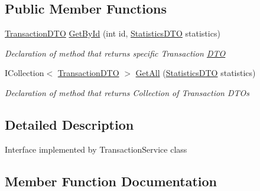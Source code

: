 \subsection*{Public Member Functions}
\begin{DoxyCompactItemize}
\item 
\mbox{\hyperlink{class_gielda_l2_1_1_i_n_f_r_a_s_t_r_u_c_t_u_r_e_1_1_d_t_o_1_1_transaction_d_t_o}{Transaction\+D\+TO}} \mbox{\hyperlink{interface_gielda_l2_1_1_i_n_f_r_a_s_t_r_u_c_t_u_r_e_1_1_interfaces_1_1_i_transaction_service_a3cb57e9f3d8b0bde5fc57b75929ec2f5}{Get\+By\+Id}} (int id, \mbox{\hyperlink{class_gielda_l2_1_1_i_n_f_r_a_s_t_r_u_c_t_u_r_e_1_1_d_t_o_1_1_statistics_d_t_o}{Statistics\+D\+TO}} statistics)
\begin{DoxyCompactList}\small\item\em Declaration of method that returns specific Transaction \mbox{\hyperlink{namespace_gielda_l2_1_1_i_n_f_r_a_s_t_r_u_c_t_u_r_e_1_1_d_t_o}{D\+TO}} \end{DoxyCompactList}\item 
I\+Collection$<$ \mbox{\hyperlink{class_gielda_l2_1_1_i_n_f_r_a_s_t_r_u_c_t_u_r_e_1_1_d_t_o_1_1_transaction_d_t_o}{Transaction\+D\+TO}} $>$ \mbox{\hyperlink{interface_gielda_l2_1_1_i_n_f_r_a_s_t_r_u_c_t_u_r_e_1_1_interfaces_1_1_i_transaction_service_a6e7f886d9873ef3042fdc507308f9be7}{Get\+All}} (\mbox{\hyperlink{class_gielda_l2_1_1_i_n_f_r_a_s_t_r_u_c_t_u_r_e_1_1_d_t_o_1_1_statistics_d_t_o}{Statistics\+D\+TO}} statistics)
\begin{DoxyCompactList}\small\item\em Declaration of method that returns Collection of Transaction D\+T\+Os \end{DoxyCompactList}\end{DoxyCompactItemize}


\subsection{Detailed Description}
Interface implemented by Transaction\+Service class 



\subsection{Member Function Documentation}
\mbox{\label{interface_gielda_l2_1_1_i_n_f_r_a_s_t_r_u_c_t_u_r_e_1_1_interfaces_1_1_i_transaction_service_a6e7f886d9873ef3042fdc507308f9be7}} 
